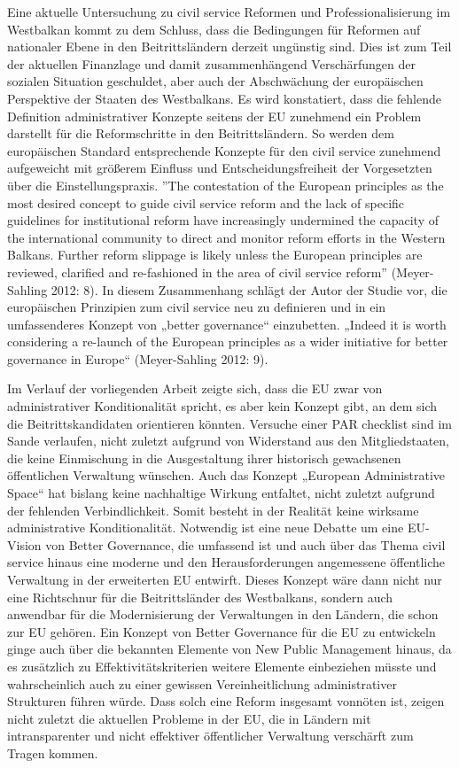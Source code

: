 Eine aktuelle Untersuchung zu civil service Reformen und Professionalisierung im Westbalkan kommt zu dem Schluss, dass die Bedingungen für Reformen auf nationaler Ebene in den Beitrittsländern derzeit ungünstig sind. Dies ist zum Teil der aktuellen Finanzlage und damit zusammenhängend Verschärfungen der sozialen Situation geschuldet, aber auch der Abschwächung der europäischen Perspektive der Staaten des Westbalkans. Es wird konstatiert, dass die fehlende Definition administrativer Konzepte seitens der EU zunehmend ein Problem darstellt für die Reformschritte in den Beitrittsländern. So werden dem europäischen Standard entsprechende Konzepte für den civil service zunehmend aufgeweicht mit größerem Einfluss und Entscheidungsfreiheit der Vorgesetzten über die Einstellungspraxis. ”The contestation of the European principles as the most desired concept to guide civil service reform and the lack of specific guidelines for institutional reform have increasingly undermined the capacity of the international community to direct and monitor reform efforts in the Western Balkans. Further reform slippage is likely unless the European principles are reviewed, clarified and re-fashioned in the area of civil service reform” (Meyer-Sahling 2012: 8). In diesem Zusammenhang schlägt der Autor der Studie vor, die europäischen Prinzipien zum civil service neu zu definieren und in ein umfassenderes Konzept von „better governance“ einzubetten. „Indeed it is worth considering a re-launch of the European principles as a wider initiative for better governance in Europe“ (Meyer-Sahling 2012: 9). \par
Im Verlauf der vorliegenden Arbeit zeigte sich, dass die EU zwar von administrativer Konditionalität spricht, es aber kein Konzept gibt, an dem sich die Beitrittskandidaten orientieren könnten. Versuche einer PAR checklist sind im Sande verlaufen, nicht zuletzt aufgrund von Widerstand aus den Mitgliedstaaten, die keine Einmischung in die Ausgestaltung ihrer historisch gewachsenen öffentlichen Verwaltung wünschen. Auch das Konzept „European Administrative Space“ hat bislang keine nachhaltige Wirkung entfaltet, nicht zuletzt aufgrund der fehlenden Verbindlichkeit. Somit besteht in der Realität keine wirksame administrative Konditionalität. Notwendig ist eine neue Debatte um eine EU-Vision von Better Governance, die umfassend ist und auch über das Thema civil service hinaus eine moderne und den Herausforderungen angemessene öffentliche Verwaltung in der erweiterten EU entwirft. Dieses Konzept wäre dann nicht nur eine Richtschnur für die Beitrittsländer des Westbalkans, sondern auch anwendbar für die Modernisierung der Verwaltungen in den Ländern, die schon zur EU gehören. Ein Konzept von Better Governance für die EU zu entwickeln ginge auch über die bekannten Elemente von New Public Management hinaus, da es zusätzlich zu Effektivitätskriterien weitere Elemente einbeziehen müsste und wahrscheinlich auch zu einer gewissen Vereinheitlichung administrativer Strukturen führen würde. Dass solch eine Reform insgesamt vonnöten ist, zeigen nicht zuletzt die aktuellen Probleme in der EU, die in Ländern mit intransparenter und nicht effektiver öffentlicher Verwaltung verschärft zum Tragen kommen.

